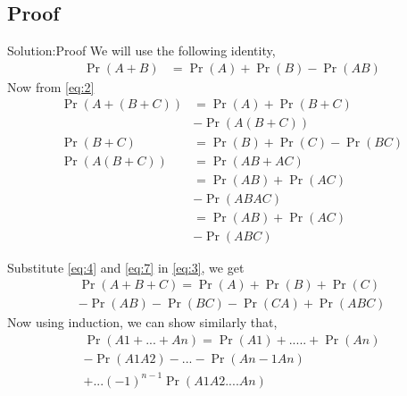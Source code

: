 \documentclass{beamer}
\providecommand{\pr}[1]{\ensuremath{\Pr\left(#1\right)}}
\providecommand{\brak}[1]{\ensuremath{\left(#1\right)}}
\begin{document}
\subsection{Proof}
  \begin{frame}{Solution:Proof}
       We will use the following identity,
              \begin{align}
                 \pr{A+B} &= \pr{A} +\pr{B} - \pr{AB}\label{eq:2}
              \end{align}
        Now from \eqref{eq:2}
              \begin{align}
                \pr{A + \brak{B + C}} &= \pr{A} + \pr{B+C}\label{eq:3}\\
                                                 & - \pr{A\brak{B+C}}\nonumber \\
                \pr{B+C} &= \pr{B} + \pr{C} - \pr{BC}\label{eq:4}\\
                \pr{A\brak{B+C}} &= \pr{AB + AC}\\
                                           & = \pr{AB} +\pr{AC}\\
                                            & -\pr{ABAC} \nonumber\\
                                           &= \pr{AB} +\pr{AC}\label{eq:7} \\ 
                                           &-\pr{ABC} \nonumber
               \end{align}
              \end{frame}
             \begin{frame}
           Substitute \eqref{eq:4} and \eqref{eq:7} in \eqref{eq:3}, we get
         \begin{equation}
           \begin{split}
              \pr{A+B+C} = \pr{A} + \pr{B} + \pr{C}\label{eq:9} \\  
                                                           - \pr{AB}  -\pr{BC}-\pr{CA} + \pr{ABC}
            \end{split}
        \end{equation}
         Now using induction, we can show similarly that,
             \begin{equation}
               \begin{split}
              \pr{A1+...+An} = \pr{A1} + ..... +\pr{An}\\
                                                   -\pr{A1A2}-... -\pr{An-1An}\\
                                            + ... \brak{-1}^{n-1}\pr{A1A2....An}
              \end{split}
             \end{equation}
           \end{frame}
\end{document}
